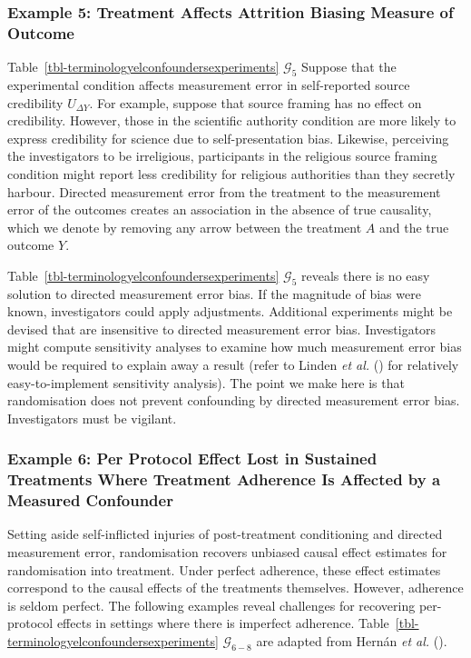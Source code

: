 \documentclass[
  single column]{article}
\begin{document}
\subsubsection{Example 5: Treatment Affects Attrition Biasing Measure of
Outcome}\label{example-5-treatment-affects-attrition-biasing-measure-of-outcome}

Table~\ref{tbl-terminologyelconfoundersexperiments} \(\mathcal{G}_{5}\)
Suppose that the experimental condition affects measurement error in
self-reported source credibility \(U_{\Delta Y}\). For example, suppose
that source framing has no effect on credibility. However, those in the
scientific authority condition are more likely to express credibility
for science due to self-presentation bias. Likewise, perceiving the
investigators to be irreligious, participants in the religious source
framing condition might report less credibility for religious
authorities than they secretly harbour. Directed measurement error from
the treatment to the measurement error of the outcomes creates an
association in the absence of true causality, which we denote by
removing any arrow between the treatment \(A\) and the true outcome
\(Y\).

Table~\ref{tbl-terminologyelconfoundersexperiments} \(\mathcal{G}_{5}\)
reveals there is no easy solution to directed measurement error bias. If
the magnitude of bias were known, investigators could apply adjustments.
Additional experiments might be devised that are insensitive to directed
measurement error bias. Investigators might compute sensitivity analyses
to examine how much measurement error bias would be required to explain
away a result (refer to Linden \emph{et al.}
() for relatively easy-to-implement
sensitivity analysis). The point we make here is that randomisation does
not prevent confounding by directed measurement error bias.
Investigators must be vigilant.

\subsubsection{Example 6: Per Protocol Effect Lost in Sustained
Treatments Where Treatment Adherence Is Affected by a Measured
Confounder}\label{example-6-per-protocol-effect-lost-in-sustained-treatments-where-treatment-adherence-is-affected-by-a-measured-confounder}

Setting aside self-inflicted injuries of post-treatment conditioning and
directed measurement error, randomisation recovers unbiased causal
effect estimates for randomisation into treatment. Under perfect
adherence, these effect estimates correspond to the causal effects of
the treatments themselves. However, adherence is seldom perfect. The
following examples reveal challenges for recovering per-protocol effects
in settings where there is imperfect adherence.
Table~\ref{tbl-terminologyelconfoundersexperiments}
\(\mathcal{G}_{6-8}\) are adapted from Hernán \emph{et al.}
().
\end{document}
